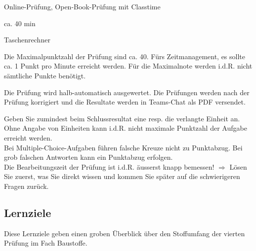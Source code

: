 \begin{description}[leftmargin=!,labelwidth=\widthof{Hinweise zur Bearbeitung...},font=\normalfont]
\item [Prüfungsmodus] Online-Prüfung, Open-Book-Prüfung mit Classtime
\item  [Prüfungsdauer] ca. 40 min
\item [Empfohlene Hilfsmittel] Taschenrechner
\item [Anzahl Punkte] Die Maximalpunktzahl der Prüfung sind ca. 40.  Fürs Zeitmanagement, es sollte ca. 1 Punkt pro Minute erreicht werden. Für die Maximalnote werden i.d.R. nicht sämtliche Punkte benötigt.
\item [Bewertung] Die Prüfung wird halb-automatisch ausgewertet. Die Prüfungen werden nach der Prüfung korrigiert und die Resultate werden in Teams-Chat als PDF versendet.
\item [Hinweise zur Bearbeitung] Geben Sie zumindest beim Schlussresultat eine resp. die verlangte Einheit an. Ohne Angabe von Einheiten kann i.d.R. nicht maximale Punktzahl der Aufgabe erreicht werden. \\ Bei Multiple-Choice-Aufgaben führen falsche Kreuze nicht zu Punktabzug. Bei grob falschen Antworten kann ein Punktabzug erfolgen. \\ Die Bearbeitungszeit der Prüfung ist i.d.R. äusserst knapp bemessen! $\Rightarrow$ Lösen Sie zuerst, was Sie direkt wissen und kommen Sie später auf die schwierigeren Fragen zurück.
\end{description}


\pagebreak
\subsection*{Lernziele}
Diese Lernziele geben einen groben Überblick über den Stoffumfang der vierten Prüfung im Fach Baustoffe.











